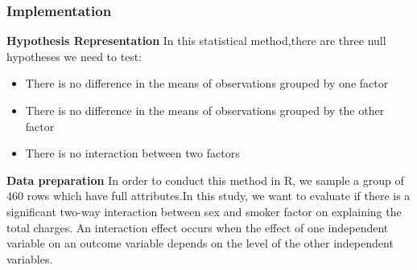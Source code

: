 \documentclass[a4paper]{article}
\begin{document}
\subsubsection{Implementation}
\textbf{Hypothesis Representation}
In this statistical method,there are three null hypotheses we need to test:
\begin{itemize}
    \item There is no difference in the means of observations grouped by one factor 
    \item There is no difference in the means of observations grouped by the other factor
    \item There is no interaction between two factors
\end{itemize}
\textbf{Data preparation}
In order to conduct this method in R, we sample a group of 460 rows which have full attributes.In this study, we want to evaluate if there is a significant two-way interaction between sex and smoker factor on explaining the total charges. An interaction effect occurs when the effect of one independent variable on an outcome variable depends on the level of the other independent variables.
\end{document}
